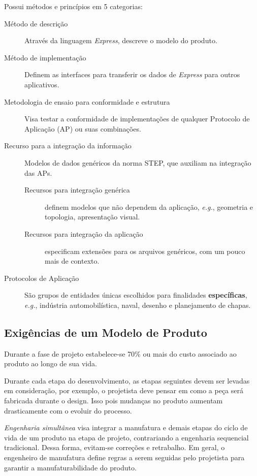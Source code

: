 \documentclass[a4paper]{report}
\begin{document}
Possui métodos e princípios em 5 categorias:
\begin{description}
    \item[Método de descrição] Através da linguagem \emph{Express}, descreve o modelo do produto.
    \item[Método de implementação] Definem as interfaces para transferir os dados de \emph{Express} para outros aplicativos.
    \item[Metodologia de ensaio para conformidade e estrutura] Visa testar a conformidade de implementações de qualquer Protocolo de Aplicação (AP) ou suas combinações.
    \item[Recurso para a integração da informação] Modelos de dados genéricos da norma STEP, que auxiliam na integração das APs.
	\begin{description}
	    \item[Recursos para integração genérica] definem modelos que não dependem da aplicação, \emph{e.g.}, geometria e topologia, apresentação visual.
	    \item[Recursos para integração da aplicação] especificam extensões para os arquivos genéricos, com um pouco mais de contexto.
	\end{description}
    \item[Protocolos de Aplicação] São grupos de entidades únicas escolhidos para finalidades \textbf{específicas}, \emph{e.g.}, indústria automobilística, naval, desenho e planejamento de chapas.
\end{description}

\subsection*{Exigências de um Modelo de Produto}

Durante a fase de projeto estabelece-se 70\% ou mais do custo associado ao produto ao longo de sua vida.

Durante cada etapa do desenvolvimento, as etapas seguintes devem ser levadas em consideração, por exemplo, o projetista deve pensar em como a peça será fabricada durante o design. Isso pois mudanças no produto aumentam drasticamente com o evoluir do processo.

\emph{Engenharia simultânea} visa integrar a manufatura e demais etapas do ciclo de vida de um produto na etapa de projeto, contrariando a engenharia sequencial tradicional. Dessa forma, evitam-se correções e retrabalho. Em geral, o engenheiro de manufatura define regras a serem seguidas pelo projetista para garantir a manufaturabilidade do produto.
\end{document}
